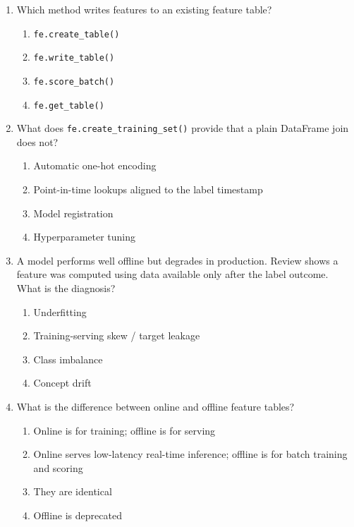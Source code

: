 \documentclass[11pt]{article}
\begin{document}
\begin{enumerate}[leftmargin=*, label=\textbf{Q\arabic*.}]
		\item Which method writes features to an existing feature table?
		\begin{enumerate}[label=(\alph*)]
			\item \texttt{fe.create\_table()}
			\item \texttt{fe.write\_table()}
			\item \texttt{fe.score\_batch()}
			\item \texttt{fe.get\_table()}
		\end{enumerate}
		
		\item What does \texttt{fe.create\_training\_set()} provide that a plain DataFrame join does not?
		\begin{enumerate}[label=(\alph*)]
			\item Automatic one-hot encoding
			\item Point-in-time lookups aligned to the label timestamp
			\item Model registration
			\item Hyperparameter tuning
		\end{enumerate}
		
		\item A model performs well offline but degrades in production. Review shows a feature was computed using data available only after the label outcome. What is the diagnosis?
		\begin{enumerate}[label=(\alph*)]
			\item Underfitting
			\item Training-serving skew / target leakage
			\item Class imbalance
			\item Concept drift
		\end{enumerate}
		
		\item What is the difference between online and offline feature tables?
		\begin{enumerate}[label=(\alph*)]
			\item Online is for training; offline is for serving
			\item Online serves low-latency real-time inference; offline is for batch training and scoring
			\item They are identical
			\item Offline is deprecated
		\end{enumerate}
		

\end{enumerate}
\end{document}
